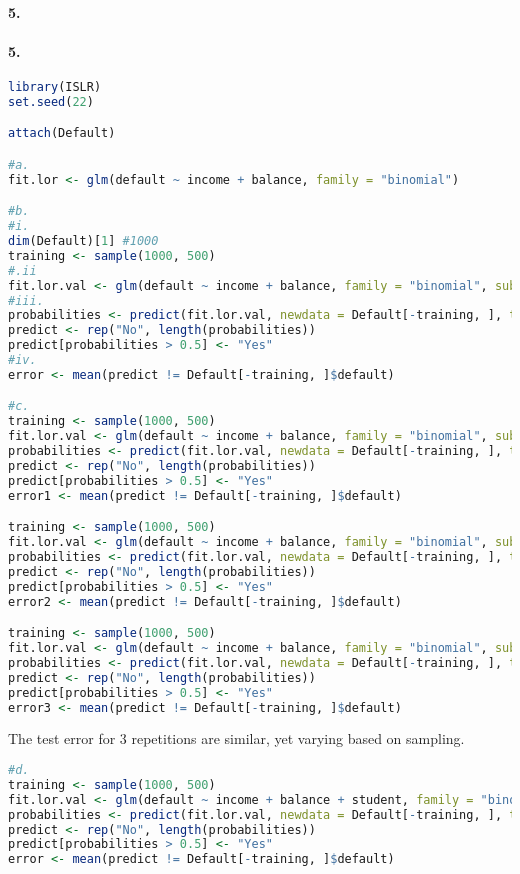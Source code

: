 \documentclass[11pt]{report}
\begin{document}
\paragraph{5. }
\paragraph{5. }
\begin{lstlisting}[language=R, breaklines=true, basicstyle=\ttfamily]
library(ISLR)
set.seed(22)

attach(Default)

#a.
fit.lor <- glm(default ~ income + balance, family = "binomial")

#b.
#i.
dim(Default)[1] #1000
training <- sample(1000, 500)
#.ii
fit.lor.val <- glm(default ~ income + balance, family = "binomial", subset = training)
#iii.
probabilities <- predict(fit.lor.val, newdata = Default[-training, ], type = "response")
predict <- rep("No", length(probabilities))
predict[probabilities > 0.5] <- "Yes"
#iv.
error <- mean(predict != Default[-training, ]$default)

#c.
training <- sample(1000, 500)
fit.lor.val <- glm(default ~ income + balance, family = "binomial", subset = training)
probabilities <- predict(fit.lor.val, newdata = Default[-training, ], type = "response")
predict <- rep("No", length(probabilities))
predict[probabilities > 0.5] <- "Yes"
error1 <- mean(predict != Default[-training, ]$default)

training <- sample(1000, 500)
fit.lor.val <- glm(default ~ income + balance, family = "binomial", subset = training)
probabilities <- predict(fit.lor.val, newdata = Default[-training, ], type = "response")
predict <- rep("No", length(probabilities))
predict[probabilities > 0.5] <- "Yes"
error2 <- mean(predict != Default[-training, ]$default)

training <- sample(1000, 500)
fit.lor.val <- glm(default ~ income + balance, family = "binomial", subset = training)
probabilities <- predict(fit.lor.val, newdata = Default[-training, ], type = "response")
predict <- rep("No", length(probabilities))
predict[probabilities > 0.5] <- "Yes"
error3 <- mean(predict != Default[-training, ]$default)
\end{lstlisting}

The test error for 3 repetitions are similar, yet varying based on sampling.

\begin{lstlisting}[language=R, breaklines=true, basicstyle=\ttfamily]
#d.
training <- sample(1000, 500)
fit.lor.val <- glm(default ~ income + balance + student, family = "binomial", subset = training)
probabilities <- predict(fit.lor.val, newdata = Default[-training, ], type = "response")
predict <- rep("No", length(probabilities))
predict[probabilities > 0.5] <- "Yes"
error <- mean(predict != Default[-training, ]$default)
\end{lstlisting}
\end{document}
